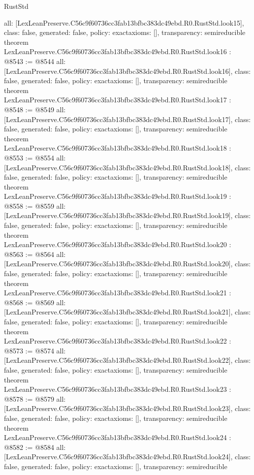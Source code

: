 \begin{lexlean}{RustStd}
\begin{coremodule}
{  all: [LexLeanPreserve.C56c9f60736cc3fab13bfbc383dc49ebd.R0.RustStd.look15],
  class: false,
  generated: false,
  policy: exact{axioms: []},
  transparency: semireducible
}
theorem LexLeanPreserve.C56c9f60736cc3fab13bfbc383dc49ebd.R0.RustStd.look16 : @8543 := @8544 {
  all: [LexLeanPreserve.C56c9f60736cc3fab13bfbc383dc49ebd.R0.RustStd.look16],
  class: false,
  generated: false,
  policy: exact{axioms: []},
  transparency: semireducible
}
theorem LexLeanPreserve.C56c9f60736cc3fab13bfbc383dc49ebd.R0.RustStd.look17 : @8548 := @8549 {
  all: [LexLeanPreserve.C56c9f60736cc3fab13bfbc383dc49ebd.R0.RustStd.look17],
  class: false,
  generated: false,
  policy: exact{axioms: []},
  transparency: semireducible
}
theorem LexLeanPreserve.C56c9f60736cc3fab13bfbc383dc49ebd.R0.RustStd.look18 : @8553 := @8554 {
  all: [LexLeanPreserve.C56c9f60736cc3fab13bfbc383dc49ebd.R0.RustStd.look18],
  class: false,
  generated: false,
  policy: exact{axioms: []},
  transparency: semireducible
}
theorem LexLeanPreserve.C56c9f60736cc3fab13bfbc383dc49ebd.R0.RustStd.look19 : @8558 := @8559 {
  all: [LexLeanPreserve.C56c9f60736cc3fab13bfbc383dc49ebd.R0.RustStd.look19],
  class: false,
  generated: false,
  policy: exact{axioms: []},
  transparency: semireducible
}
theorem LexLeanPreserve.C56c9f60736cc3fab13bfbc383dc49ebd.R0.RustStd.look20 : @8563 := @8564 {
  all: [LexLeanPreserve.C56c9f60736cc3fab13bfbc383dc49ebd.R0.RustStd.look20],
  class: false,
  generated: false,
  policy: exact{axioms: []},
  transparency: semireducible
}
theorem LexLeanPreserve.C56c9f60736cc3fab13bfbc383dc49ebd.R0.RustStd.look21 : @8568 := @8569 {
  all: [LexLeanPreserve.C56c9f60736cc3fab13bfbc383dc49ebd.R0.RustStd.look21],
  class: false,
  generated: false,
  policy: exact{axioms: []},
  transparency: semireducible
}
theorem LexLeanPreserve.C56c9f60736cc3fab13bfbc383dc49ebd.R0.RustStd.look22 : @8573 := @8574 {
  all: [LexLeanPreserve.C56c9f60736cc3fab13bfbc383dc49ebd.R0.RustStd.look22],
  class: false,
  generated: false,
  policy: exact{axioms: []},
  transparency: semireducible
}
theorem LexLeanPreserve.C56c9f60736cc3fab13bfbc383dc49ebd.R0.RustStd.look23 : @8578 := @8579 {
  all: [LexLeanPreserve.C56c9f60736cc3fab13bfbc383dc49ebd.R0.RustStd.look23],
  class: false,
  generated: false,
  policy: exact{axioms: []},
  transparency: semireducible
}
theorem LexLeanPreserve.C56c9f60736cc3fab13bfbc383dc49ebd.R0.RustStd.look24 : @8582 := @8584 {
  all: [LexLeanPreserve.C56c9f60736cc3fab13bfbc383dc49ebd.R0.RustStd.look24],
  class: false,
  generated: false,
  policy: exact{axioms: []},
  transparency: semireducible
}
\end{coremodule}
\end{lexlean}
